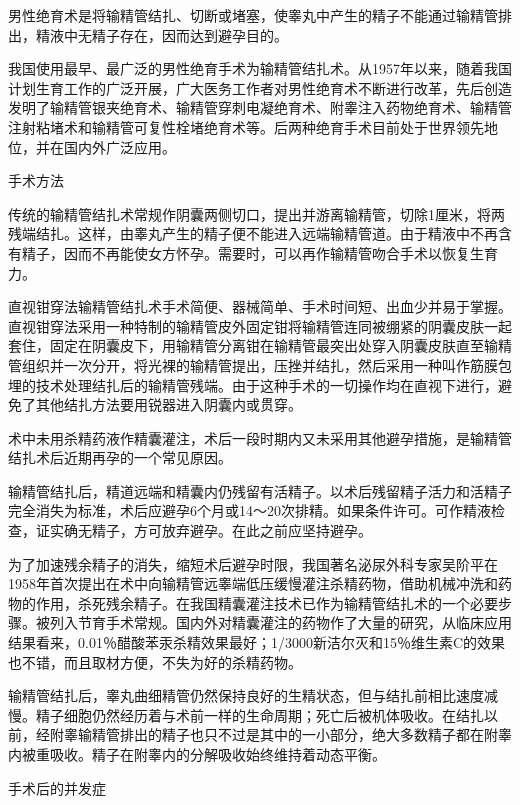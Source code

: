\documentclass[12pt,UTF8]{ctexbook}
\begin{document}
男性绝育术是将输精管结扎、切断或堵塞，使睾丸中产生的精子不能通过输精管排出，精液中无精子存在，因而达到避孕目的。

我国使用最早、最广泛的男性绝育手术为输精管结扎术。从1957年以来，随着我国计划生育工作的广泛开展，广大医务工作者对男性绝育术不断进行改革，先后创造发明了输精管银夹绝育术、输精管穿刺电凝绝育术、附睾注入药物绝育术、输精管注射粘堵术和输精管可复性栓堵绝育术等。后两种绝育手术目前处于世界领先地位，并在国内外广泛应用。





手术方法


传统的输精管结扎术常规作阴囊两侧切口，提出并游离输精管，切除1厘米，将两残端结扎。这样，由睾丸产生的精子便不能进入远端输精管道。由于精液中不再含有精子，因而不再能使女方怀孕。需要时，可以再作输精管吻合手术以恢复生育力。

直视钳穿法输精管结扎术手术简便、器械简单、手术时间短、出血少并易于掌握。直视钳穿法采用一种特制的输精管皮外固定钳将输精管连同被绷紧的阴囊皮肤一起套住，固定在阴囊皮下，用输精管分离钳在输精管最突出处穿入阴囊皮肤直至输精管组织并一次分开，将光裸的输精管提出，压挫并结扎，然后采用一种叫作筋膜包埋的技术处理结扎后的输精管残端。由于这种手术的一切操作均在直视下进行，避免了其他结扎方法要用锐器进入阴囊内或贯穿。

术中未用杀精药液作精囊灌注，术后一段时期内又未采用其他避孕措施，是输精管结扎术后近期再孕的一个常见原因。

输精管结扎后，精道远端和精囊内仍残留有活精子。以术后残留精子活力和活精子完全消失为标准，术后应避孕6个月或14～20次排精。如果条件许可。可作精液检查，证实确无精子，方可放弃避孕。在此之前应坚持避孕。

为了加速残余精子的消失，缩短术后避孕时限，我国著名泌尿外科专家吴阶平在1958年首次提出在术中向输精管远睾端低压缓慢灌注杀精药物，借助机械冲洗和药物的作用，杀死残余精子。在我国精囊灌注技术已作为输精管结扎术的一个必要步骤。被列入节育手术常规。国内外对精囊灌注的药物作了大量的研究，从临床应用结果看来，0.01％醋酸苯汞杀精效果最好；1/3000新洁尔灭和15％维生素C的效果也不错，而且取材方便，不失为好的杀精药物。

输精管结扎后，睾丸曲细精管仍然保持良好的生精状态，但与结扎前相比速度减慢。精子细胞仍然经历着与术前一样的生命周期；死亡后被机体吸收。在结扎以前，经附睾输精管排出的精子也只不过是其中的一小部分，绝大多数精子都在附睾内被重吸收。精子在附睾内的分解吸收始终维持着动态平衡。





手术后的并发症
\end{document}
